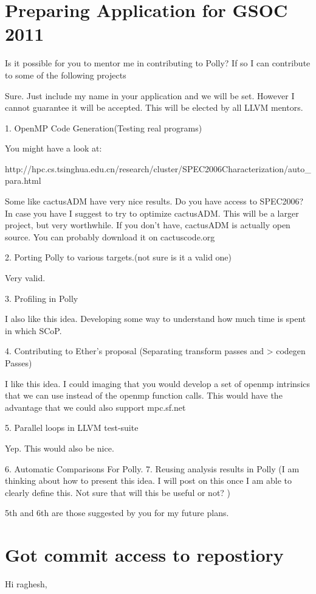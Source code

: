 \documentclass[a4paper,10pt]{article}
\begin{document}
\section{Preparing Application for GSOC 2011}
Is it possible for you to mentor me in contributing to Polly? If so I
can contribute to some of the following projects

Sure. Just include my name in your application and we will be set. However I cannot guarantee it will be accepted. This will be elected by all LLVM mentors.

1. OpenMP Code Generation(Testing real programs)

	You might have a look at:

	http://hpc.cs.tsinghua.edu.cn/research/cluster/SPEC2006Characterization/auto\_para.html

	Some like cactusADM have very nice results. Do you have access to SPEC2006? In case you have I suggest to try to optimize cactusADM.
	This will be a larger project, but very worthwhile. If you don't have,
	     cactusADM is actually open source. You can probably download it
		     on cactuscode.org

		     2. Porting Polly to various targets.(not sure is it a valid one)

		     Very valid.

		      3. Profiling in Polly

		     I also like this idea. Developing some way to understand how much time is spent in which SCoP.

		      4. Contributing to Ether's proposal (Separating transform passes and
				     > codegen Passes)

		     I like this idea. I could imaging that you would develop a set of openmp
		     intrinsics that we can use instead of the openmp function calls. This
		     would have the advantage that we could also support mpc.sf.net

		      5. Parallel loops in LLVM test-suite

		     Yep. This would also be nice.

		      6. Automatic Comparisons For Polly.
		      7. Reusing analysis results in Polly (I am thinking about how to
				     present this idea. I will post on this once I am able to clearly
				     define this. Not sure that will this be useful or not? )

		     5th and 6th are those suggested by you for my future plans.

		     
\section{Got commit access to repostiory}
Hi raghesh,
\end{document}
